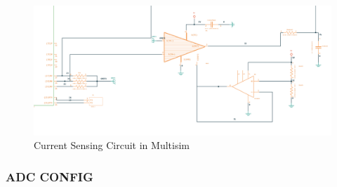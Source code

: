 \begin{figure}[H]
	\centering
	\includegraphics[width=6in]{sections/section4/images/PCBDesign/Multisim/MultisimCurrentSensing.png}
	\caption{Current Sensing Circuit in Multisim}
\end{figure}


\subsubsection{ADC CONFIG}


\newpage